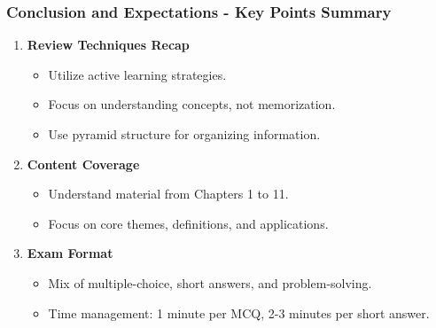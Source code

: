 \documentclass[aspectratio=169]{beamer}
\begin{document}
\begin{frame}[fragile]
    \frametitle{Conclusion and Expectations - Key Points Summary}
    \begin{enumerate}
        \item \textbf{Review Techniques Recap}
        \begin{itemize}
            \item Utilize active learning strategies.
            \item Focus on understanding concepts, not memorization.
            \item Use pyramid structure for organizing information.
        \end{itemize}

        \item \textbf{Content Coverage}
        \begin{itemize}
            \item Understand material from Chapters 1 to 11.
            \item Focus on core themes, definitions, and applications.
        \end{itemize}

        \item \textbf{Exam Format}
        \begin{itemize}
            \item Mix of multiple-choice, short answers, and problem-solving.
            \item Time management: 1 minute per MCQ, 2-3 minutes per short answer.
        \end{itemize}
    \end{enumerate}
\end{frame}
\end{document}
